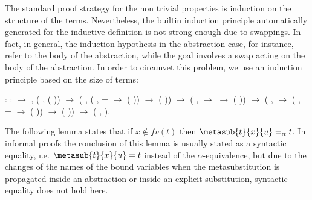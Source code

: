 The standard proof strategy for the non trivial properties is induction on the structure of the terms. Nevertheless, the builtin induction principle automatically generated for the inductive definition  is not strong enough due to swappings. In fact, in general, the induction hypothesis in the abstraction case, for instance, refer to the body of the abstraction, while the goal involves a swap acting on the body of the abstraction. In order to circunvet this problem, we use an induction principle based on the size of terms: 
\begin{coqdoccode}
\coqdocemptyline
\coqdocnoindent
{} :\coqdoceol
\coqdocindent{0.50em}
\coqdockw{\ensuremath{\forall}}  :  \ensuremath{\rightarrow} ,\coqdoceol
\coqdocindent{0.50em}
(\coqdockw{\ensuremath{\forall}} ,  ( )) \ensuremath{\rightarrow}\coqdoceol
\coqdocindent{0.50em}
(\coqdockw{\ensuremath{\forall}}  , (\coqdockw{\ensuremath{\forall}}   ,   =   \ensuremath{\rightarrow}  (   )) \ensuremath{\rightarrow}  (  )) \ensuremath{\rightarrow}\coqdoceol
\coqdocindent{0.50em}
(\coqdockw{\ensuremath{\forall}}  ,   \ensuremath{\rightarrow}   \ensuremath{\rightarrow}  (  )) \ensuremath{\rightarrow}\coqdoceol
\coqdocindent{0.50em}
(\coqdockw{\ensuremath{\forall}}   ,   \ensuremath{\rightarrow} (\coqdockw{\ensuremath{\forall}}   ,   =   \ensuremath{\rightarrow}  (   )) \ensuremath{\rightarrow}  (   )) \ensuremath{\rightarrow} \coqdoceol
\coqdocindent{0.50em}
(\coqdockw{\ensuremath{\forall}} ,  ).\coqdoceol
\coqdocemptyline
\coqdocemptyline
\end{coqdoccode}
The following lemma states that if $x \notin fv(t)$ then $\metasub{t}{x}{u} =_\alpha t$. In informal proofs the conclusion of this lemma is usually stated as a syntactic equality, {\i.e.} $\metasub{t}{x}{u} = t$ instead of the $\alpha$-equivalence, but due to the changes of the names of the bound variables when the metasubstitution is propagated inside an abstraction or inside an explicit substitution, syntactic equality does not hold here. 
